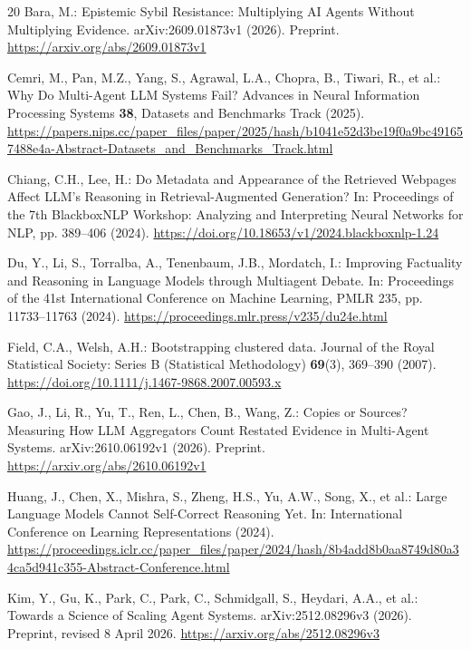 \documentclass{svproc}
\begin{document}
\begin{thebibliography}{20}
Bara, M.: Epistemic Sybil Resistance: Multiplying AI Agents Without Multiplying
Evidence. arXiv:2609.01873v1 (2026). Preprint.
\url{https://arxiv.org/abs/2609.01873v1}

Cemri, M., Pan, M.Z., Yang, S., Agrawal, L.A., Chopra, B., Tiwari, R., et al.: Why Do Multi-Agent LLM Systems Fail? Advances in Neural Information
Processing Systems \textbf{38}, Datasets and Benchmarks Track (2025).
\url{https://papers.nips.cc/paper_files/paper/2025/hash/b1041e52d3be19f0a9bc491657488e4a-Abstract-Datasets_and_Benchmarks_Track.html}

Chiang, C.H., Lee, H.: Do Metadata and Appearance of the Retrieved Webpages Affect
LLM's Reasoning in Retrieval-Augmented Generation? In: Proceedings of the 7th
BlackboxNLP Workshop: Analyzing and Interpreting Neural Networks for NLP,
pp. 389--406 (2024). \url{https://doi.org/10.18653/v1/2024.blackboxnlp-1.24}

Du, Y., Li, S., Torralba, A., Tenenbaum, J.B., Mordatch, I.: Improving Factuality
and Reasoning in Language Models through Multiagent Debate. In: Proceedings of
the 41st International Conference on Machine Learning, PMLR 235,
pp. 11733--11763 (2024). \url{https://proceedings.mlr.press/v235/du24e.html}

Field, C.A., Welsh, A.H.: Bootstrapping clustered data. Journal of the Royal
Statistical Society: Series B (Statistical Methodology) \textbf{69}(3),
369--390 (2007). \url{https://doi.org/10.1111/j.1467-9868.2007.00593.x}

Gao, J., Li, R., Yu, T., Ren, L., Chen, B., Wang, Z.:
Copies or Sources? Measuring How LLM Aggregators Count Restated Evidence in
Multi-Agent Systems. arXiv:2610.06192v1 (2026). Preprint.
\url{https://arxiv.org/abs/2610.06192v1}

Huang, J., Chen, X., Mishra, S., Zheng, H.S., Yu, A.W., Song, X., et al.:
Large Language Models Cannot Self-Correct Reasoning Yet. In: International
Conference on Learning Representations (2024).
\url{https://proceedings.iclr.cc/paper_files/paper/2024/hash/8b4add8b0aa8749d80a34ca5d941c355-Abstract-Conference.html}

Kim, Y., Gu, K., Park, C., Park, C., Schmidgall, S., Heydari, A.A., et al.:
Towards a Science of Scaling Agent Systems. arXiv:2512.08296v3 (2026).
Preprint, revised 8 April 2026. \url{https://arxiv.org/abs/2512.08296v3}


\end{thebibliography}
\end{document}
